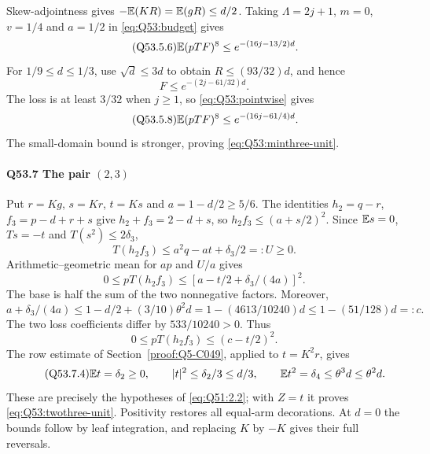 Skew-adjointness gives $-\mathbb E(KR)=\allowbreak \mathbb E(gR)\le\allowbreak  d/2$.
Taking $\Lambda=\allowbreak 2j+1$, $m=\allowbreak 0$, $v=\allowbreak 1/4$ and $a=\allowbreak 1/2$ in
\eqref{eq:Q53:budget} gives
\begin{equation}\tag{Q53.5.6}\label{eq:Q53:small-payment}
 \mathbb E(pTF)^8\le e^{-(16j-13/2)d}.
\end{equation}
For $1/9\le\allowbreak  d\le\allowbreak 1/3$, use $\sqrt d\le\allowbreak 3d$ to obtain
$R\le\allowbreak (93/32)d$, and hence
\begin{equation}\tag{Q53.5.7}\label{eq:Q53:large-envelope}
 F\le e^{-(2j-61/32)d}.
\end{equation}
The loss is at least $3/32$ when $j\ge\allowbreak 1$, so
\eqref{eq:Q53:pointwise} gives
\begin{equation}\tag{Q53.5.8}\label{eq:Q53:large-payment}
 \mathbb E(pTF)^8\le e^{-(16j-61/4)d}.
\end{equation}
The small-domain bound is stronger, proving \eqref{eq:Q53:minthree-unit}.

\paragraph{Q53.7 The pair $(2,\allowbreak 3)$}\label{part:Q53.7}
Put $r=\allowbreak Kg$, $s=\allowbreak Kr$, $t=\allowbreak Ks$ and $a=\allowbreak 1-d/2\ge\allowbreak 5/6$.
The identities $h_2=\allowbreak q-r$, $f_3=\allowbreak p-d+r+s$ give
$h_2+f_3=\allowbreak 2-d+s$, so $h_2f_3\le\allowbreak (a+s/2)^2$.
Since $\mathbb E s=\allowbreak 0$, $Ts=\allowbreak -t$ and $T(s^2)\le\allowbreak 2\delta_3$,
\[
 T(h_2f_3)\le a^2q-at+\delta_3/2=:U\ge0.
\]
Arithmetic--geometric mean for $ap$ and $U/a$ gives
\begin{equation}\tag{Q53.7.1}\label{eq:Q53:twothree-square}
 0\le pT(h_2f_3)\le[a-t/2+\delta_3/(4a)]^2.
\end{equation}
The base is half the sum of the two nonnegative factors. Moreover,
\[
 a+\delta_3/(4a)\le1-d/2+(3/10)\theta^2d
 =1-(4613/10240)d\le1-(51/128)d=:c.
\]
The two loss coefficients differ by $533/10240>\allowbreak 0$. Thus
\begin{equation}\tag{Q53.7.3}\label{eq:Q53:twothree-majorant}
 0\le pT(h_2f_3)\le(c-t/2)^2.
\end{equation}
The row estimate of Section~\ref{proof:Q5-C049}, applied to $t=\allowbreak K^2r$, gives
\begin{equation}\tag{Q53.7.4}\label{eq:Q53:twothree-data}
 \mathbb E t=\delta_2\ge0,\qquad |t|^2\le\delta_2/3\le d/3,
 \qquad \mathbb E t^2=\delta_4\le\theta^3d\le\theta^2d.
\end{equation}
These are precisely the hypotheses of \eqref{eq:Q51:2.2}; with $Z=\allowbreak t$ it
proves \eqref{eq:Q53:twothree-unit}. Positivity restores all equal-arm
decorations. At $d=\allowbreak 0$ the bounds follow by leaf integration, and replacing
$K$ by $-K$ gives their full reversals.
